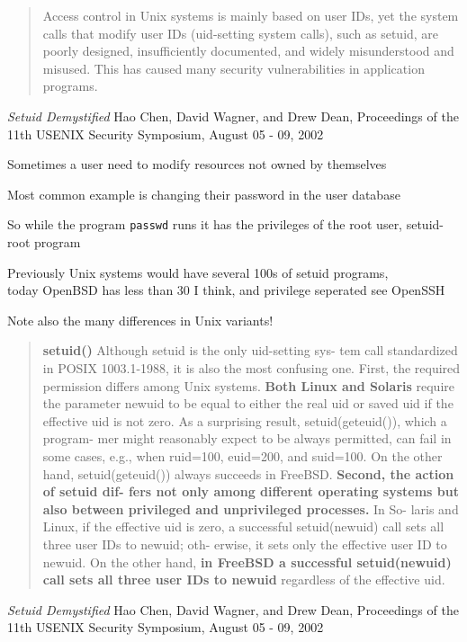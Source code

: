 \documentclass[Screen16to9,17pt]{foils}
\begin{document}

\begin{quote}
Access control in Unix systems is mainly based on user
IDs, yet the system calls that modify user IDs (uid-setting
system calls), such as setuid, are poorly designed, insufficiently documented, and widely misunderstood and
misused. This has caused many security vulnerabilities
in application programs.
\end{quote}

\emph{Setuid Demystified} Hao Chen, David Wagner, and Drew Dean,
Proceedings of the 11th USENIX Security Symposium,
August 05 - 09, 2002


\begin{list2}
\item Sometimes a user need to modify resources not owned by themselves
\item Most common example is changing their password in the user database
\item So while the program \verb+passwd+ runs it has the privileges of the root user, setuid-root program
\item Previously Unix systems would have several 100s of setuid programs, \\
today OpenBSD has less than 30 I think, and privilege seperated see OpenSSH
\item Note also the many differences in Unix variants!
\end{list2}


\begin{quote}
{\bf setuid()} Although setuid is the only uid-setting sys-
tem call standardized in POSIX 1003.1-1988, it is also
the most confusing one. First, the required permission
differs among Unix systems. {\bf Both Linux and Solaris}
require the parameter newuid to be equal to either the
real uid or saved uid if the effective uid is not zero. As
a surprising result, setuid(geteuid()), which a program-
mer might reasonably expect to be always permitted, can
fail in some cases, e.g., when ruid=100, euid=200, and
suid=100. On the other hand, setuid(geteuid()) always
succeeds in FreeBSD. {\bf Second, the action of setuid dif-
fers not only among different operating systems but also
between privileged and unprivileged processes.} In So-
laris and Linux, if the effective uid is zero, a successful
setuid(newuid) call sets all three user IDs to newuid; oth-
erwise, it sets only the effective user ID to newuid. On
the other hand, {\bf in FreeBSD a successful setuid(newuid)
call sets all three user IDs to newuid} regardless of the
effective uid.
\end{quote}
\emph{Setuid Demystified} Hao Chen, David Wagner, and Drew Dean,
Proceedings of the 11th USENIX Security Symposium,
August 05 - 09, 2002
\end{document}
